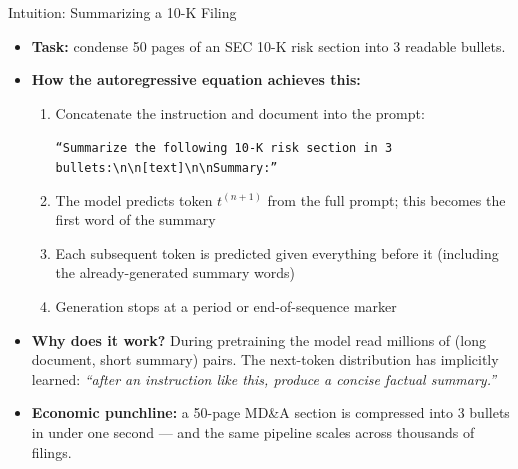 \documentclass[10pt,english,aspectratio=169]{beamer}
\begin{document}
\begin{frame}{Intuition: Summarizing a 10-K Filing}
\begin{itemize}
\item \textbf{Task:} condense 50 pages of an SEC 10-K risk section into 3 readable bullets.

\medskip
\item \textbf{How the autoregressive equation achieves this:}
\begin{enumerate}
    \item Concatenate the instruction and document into the prompt:
    \begin{center}
    \small\texttt{``Summarize the following 10-K risk section in 3 bullets:\textbackslash n\textbackslash n[text]\textbackslash n\textbackslash nSummary:''}
    \end{center}
    \item The model predicts token $t^{(n+1)}$ from the full prompt; this becomes the first word of the summary
    \item Each subsequent token is predicted given everything before it (including the already-generated summary words)
    \item Generation stops at a period or end-of-sequence marker
\end{enumerate}

\medskip
\item \textbf{Why does it work?} During pretraining the model read millions of (long document, short summary) pairs. The next-token distribution has implicitly learned: \emph{``after an instruction like this, produce a concise factual summary.''}

\medskip
\item \textbf{Economic punchline:} a 50-page MD\&A section is compressed into 3 bullets in under one second --- and the same pipeline scales across thousands of filings.
\end{itemize}
\end{frame}
\end{document}
